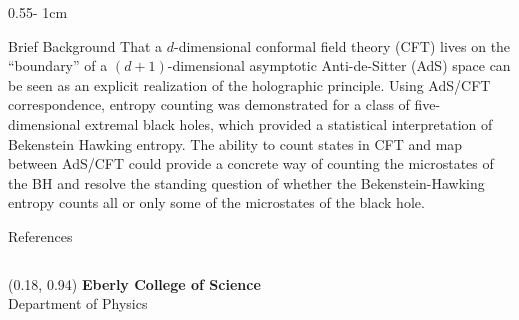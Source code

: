 \documentclass{../psuposter}
\begin{document}
\begin{frame}
\begin{columns}[t, totalwidth=\textwidth]
\begin{column}{0.55\textwidth - 1cm}
\begin{block}{Brief Background}
    	That a $d$-dimensional conformal field theory (CFT) lives on the “boundary” of a $(d + 1)$-dimensional asymptotic Anti-de-Sitter (AdS) space can be seen as an explicit realization of the holographic principle. Using AdS/CFT correspondence, entropy counting was demonstrated for a class of five-dimensional extremal black holes, which provided a statistical interpretation of Bekenstein Hawking entropy. \cite{stromingerMicroscopicOriginBekensteinHawking1996} The ability to count states in CFT and map between AdS/CFT could provide a concrete way of counting the microstates of the BH and resolve the standing question of whether the Bekenstein-Hawking entropy counts all or only some of the microstates of the black hole. \cite{zayasMicroscopicAccountBlack2020}

    \end{block}


    \begin{block}{References}
        
		
    \end{block}

\end{column}
\end{columns}


\begin{textblock}{0.5}(0.18, 0.94)
    \color{white}
    \sffamily
    \textbf{Eberly College of Science}
    \\
    Department of Physics
\end{textblock}


\end{frame}
\end{document}
